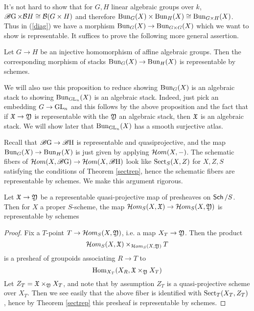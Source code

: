 \documentclass[12pt]{article}
\begin{document}
It's not hard to show that for $G, H$ linear algebraic groups over $k$, $\operatorname{\mathscr{B} G} \times \mathcal{B}H \cong \mathcal{B}(G \times H)$ and therefore $\operatorname{Bun}_G(X) \times \operatorname{Bun}_H(X) \cong \operatorname{Bun}_{G \times H}(X)$. Thus in (\ref{diag}) we have a morphism $\operatorname{Bun}_G(X) \to \operatorname{Bun}_{G \times G}(X)$ which we want to show is representable. It suffices to prove the following more general assertion.

\begin{prop}\label{injrep}
    Let $G \to H$ be an injective homomorphism of affine algebraic groups. Then the corresponding morphism of stacks $\operatorname{Bun}_G(X) \to \operatorname{Bun}_H(X)$ is representable by schemes.
\end{prop}

We will also use this proposition to reduce showing $\operatorname{Bun}_G(X)$ is an algebraic stack to showing $\operatorname{Bun}_{\operatorname{GL}_n}(X)$ is an algebraic stack. Indeed, just pick an embedding $G \to \operatorname{GL}_n$ and this follows by the above proposition and the fact that if $\mathfrak{X} \to \mathfrak{Y}$ is representable with the $\mathfrak{Y}$ an algebraic stack, then $\mathfrak{X}$ is an algebraic stack. We will show later that $\operatorname{Bun}_{\operatorname{GL}_n}(X)$ has a smooth surjective atlas.

Recall that $\operatorname{\mathscr{B} G} \to \operatorname{\mathscr{B} H}$ is representable and quasiprojective, and the map $\operatorname{Bun}_G(X) \to \operatorname{Bun}_H(X)$ is just given by applying $\mathcal{H} om(X, -)$. The schematic fibers of $\mathcal{H} om(X,\operatorname{\mathscr{B} G}) \to \mathcal{H} om(X, \operatorname{\mathscr{B} H})$ look like $\operatorname{Sect}_S(X,Z)$ for $X,Z,S$ satisfying the conditions of Theorem \ref{sectrep}, hence the schematic fibers are representable by schemes. We make this argument rigorous.

\begin{prop}
    Let $\mathfrak{X} \to \mathfrak{Y}$ be a representable quasi-projective map of presheaves on $\operatorname{\mathsf{Sch}}/S$. Then for $X$ a proper $S$-scheme, the map $\mathcal{H} om_S(X, \mathfrak{X}) \to \mathcal{H} om_S(X, \mathfrak{Y})$ is representable by schemes
\end{prop}

\begin{proof}
    Fix a $T$-point $T \to \mathcal{H} om_S(X, \mathfrak{Y})$, i.e. a map $X_T \to \mathfrak{Y}$. Then the product
    \[\mathcal{H} om_S(X, \mathfrak{X}) \times_{\mathcal{H} om_S(X, \mathfrak{Y})} T\]
    is a presheaf of groupoids associating $R \to T$ to 
    \[\operatorname{Hom}_{X_T}(X_R, \mathfrak{X} \times_{\mathfrak{Y}} X_T)\]
    Let $Z_T = \mathfrak{X} \times_{\mathfrak{Y}} X_T$, and note that by assumption $Z_T$ is a quasi-projective scheme over $X_T$. Then we see easily that the above fiber is identified with $\operatorname{Sect}_T(X_T, Z_T)$, hence by Theorem \ref{sectrep} this presheaf is representable by schemes.
\end{proof}
\end{document}

